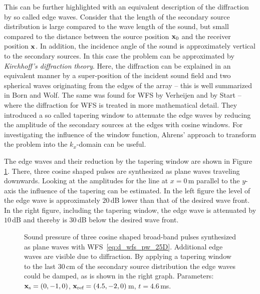 This can be further highlighted with an
equivalent description of the diffraction by so called edge waves.
Consider that the length of the secondary source distribution is large
compared to the wave
length of the sound, but small compared to the distance between the
source position $\mathbf{x}_0$ and the receiver position $\mathbf{x}$. In addition,
the incidence angle of the sound is approximately
vertical to the secondary sources. In this case the problem can be approximated by
\emph{Kirchhoff's diffraction theory}.\autocite[][Sect.\,8.3.2.]{Born1999}
Here, the
diffraction can be explained in an equivalent manner
by a super-position of the incident
sound field and two spherical waves originating from the edges of the array --
this is well summarized in Born and Wolf.\autocite[][Sect.\,8.9]{Born1999}
\FloatBarrier%
The same was found for \ac{WFS} by Verheijen\autocite{Verheijen1997} and
by Start\autocite{Start1997} -- where the diffraction for \ac{WFS} is
treated in more mathematical detail.
They introduced a so called tapering window to
attenuate the edge waves by reducing the amplitude of the secondary sources at the
edges with cosine windows. For investigating the influence of the window
function, Ahrens' approach to transform the problem into the $k_x$-domain can be
useful.\autocite[][Sect.\,3.7.4]{Ahrens2012}

The edge waves and their reduction by the tapering window are shown in
Figure\,\ref{fig:tapering}. There, three cosine shaped pulses are synthesized as
plane waves traveling downwards. Looking at the amplitudes for the line at $x
= 0$\,m parallel to the $y$-axis the influence of the tapering can be estimated.
In the left figure the level of the edge wave is approximately $20$\,dB lower than
that of the
desired wave front. In the right figure, including the tapering window, the edge
wave is attenuated by $10$\,dB and thereby is $30$\,dB below the desired wave
front.
%
\begin{figure}
    \small
    \centering
    
    \caption{Sound pressure of three cosine shaped broad-band pulses
    synthesized as plane waves with \ac{WFS}~\protect\eqref{eq:d_wfs_pw_25D}.
    Additional edge waves are visible due to diffraction.
    By applying a tapering window to the last $30$\,cm of the secondary source
    distribution the edge waves could be damped, as is shown in the
    right graph.
    Parameters: $\mathbf{x}_\text{s} =(0,-1,0)$, $\mathbf{x}_\text{ref} = (4.5,-2,0)$\,m, $t = 4.6$\,ms.
    }
    \label{fig:tapering}
\end{figure}
%

